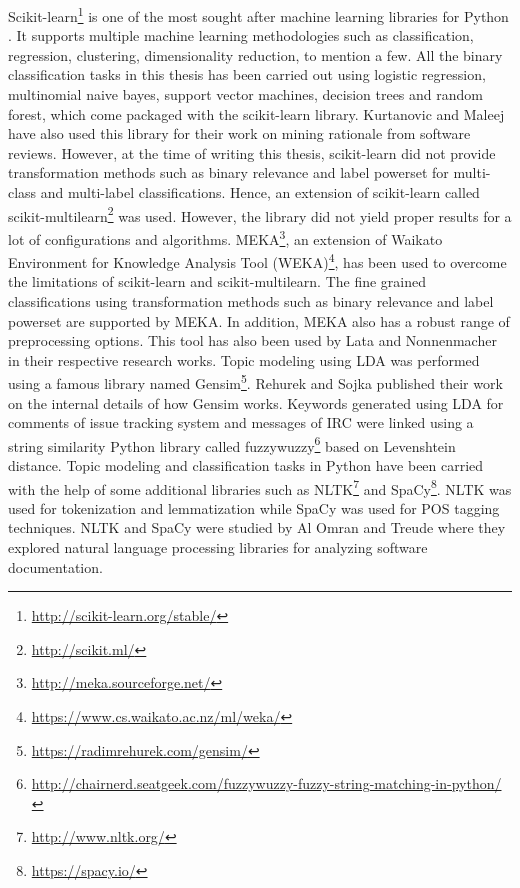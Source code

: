 \documentclass[a4paper,12pt,twoside]{report}
\begin{document}
Scikit-learn\footnote{\url{http://scikit-learn.org/stable/}} is one of the most sought after machine learning libraries for Python \cite{Pedregosa2012}. It supports multiple machine learning methodologies such as classification, regression, clustering, dimensionality reduction, to mention a few. All the binary classification tasks in this thesis has been carried out using logistic regression, multinomial naive bayes, support vector machines, decision trees and random forest, which come packaged with the scikit-learn library. Kurtanovic and Maleej \cite{Kurtanovic2017} have also used this library for their work on mining rationale from software reviews. However, at the time of writing this thesis, scikit-learn did not provide transformation methods such as binary relevance and label powerset for multi-class and multi-label classifications. Hence, an extension of scikit-learn called scikit-multilearn\footnote{\url{http://scikit.ml/}} was used. However, the library did not yield proper results for a lot of configurations and algorithms. 
\newline \newline
MEKA\footnote{\url{http://meka.sourceforge.net/}}\cite{MEKA2016}, an extension of Waikato Environment for Knowledge Analysis Tool (WEKA)\footnote{\url{https://www.cs.waikato.ac.nz/ml/weka/}}, has been used to overcome the limitations of scikit-learn and scikit-multilearn. The fine grained classifications using transformation methods such as binary relevance and label powerset are supported by MEKA. In addition, MEKA also has a robust range of preprocessing options. This tool has also been used by Lata \cite{Lata2016} and Nonnenmacher \cite{Nonnenmacher2017} in their respective research works.
\newline \newline
Topic modeling using \acs{LDA} was performed using a famous library named Gensim\footnote{\url{https://radimrehurek.com/gensim/}}. Rehurek and Sojka \cite{Rehurek2010} published their work on the internal details of how Gensim works. Keywords generated using \acs{LDA} for comments of issue tracking system and messages of \acs{IRC} were linked using a string similarity Python library called fuzzywuzzy\footnote{\url{http://chairnerd.seatgeek.com/fuzzywuzzy-fuzzy-string-matching-in-python/}} based on Levenshtein distance.
\newline
Topic modeling and classification tasks in Python have been carried with the help of some additional libraries such as NLTK\footnote{\url{http://www.nltk.org/}} and SpaCy\footnote{\url{https://spacy.io/}}. NLTK was used for tokenization and lemmatization while SpaCy was used for \acs{POS} tagging techniques. NLTK and SpaCy were studied by Al Omran and Treude \cite{AlOmran2017} where they explored natural language processing libraries for analyzing software documentation. 
\end{document}
